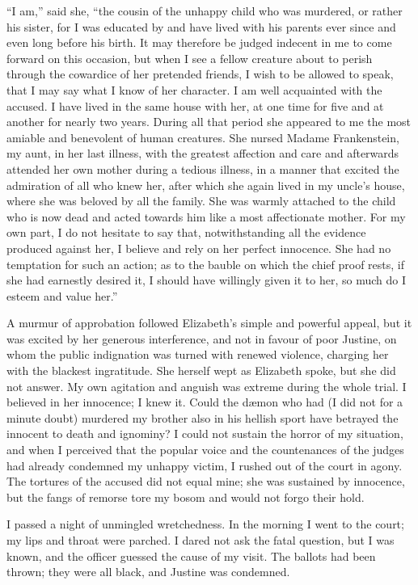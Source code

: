 \documentclass[12pt,openright]{book}
\begin{document}
“I am,” said she, “the cousin of the unhappy child who was murdered, or rather his sister, for I was educated by and have lived with his parents ever since and even long before his birth. It may therefore be judged indecent in me to come forward on this occasion, but when I see a fellow creature about to perish through the cowardice of her pretended friends, I wish to be allowed to speak, that I may say what I know of her character. I am well acquainted with the accused. I have lived in the same house with her, at one time for five and at another for nearly two years. During all that period she appeared to me the most amiable and benevolent of human creatures. She nursed Madame Frankenstein, my aunt, in her last illness, with the greatest affection and care and afterwards attended her own mother during a tedious illness, in a manner that excited the admiration of all who knew her, after which she again lived in my uncle’s house, where she was beloved by all the family. She was warmly attached to the child who is now dead and acted towards him like a most affectionate mother. For my own part, I do not hesitate to say that, notwithstanding all the evidence produced against her, I believe and rely on her perfect innocence. She had no temptation for such an action; as to the bauble on which the chief proof rests, if she had earnestly desired it, I should have willingly given it to her, so much do I esteem and value her.”

A murmur of approbation followed Elizabeth’s simple and powerful appeal, but it was excited by her generous interference, and not in favour of poor Justine, on whom the public indignation was turned with renewed violence, charging her with the blackest ingratitude. She herself wept as Elizabeth spoke, but she did not answer. My own agitation and anguish was extreme during the whole trial. I believed in her innocence; I knew it. Could the dæmon who had (I did not for a minute doubt) murdered my brother also in his hellish sport have betrayed the innocent to death and ignominy? I could not sustain the horror of my situation, and when I perceived that the popular voice and the countenances of the judges had already condemned my unhappy victim, I rushed out of the court in agony. The tortures of the accused did not equal mine; she was sustained by innocence, but the fangs of remorse tore my bosom and would not forgo their hold.

I passed a night of unmingled wretchedness. In the morning I went to the court; my lips and throat were parched. I dared not ask the fatal question, but I was known, and the officer guessed the cause of my visit. The ballots had been thrown; they were all black, and Justine was condemned.
\end{document}
